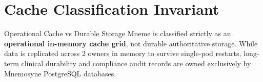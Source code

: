 \section{Cache Classification Invariant}

\begin{principlebox}{Operational Cache vs Durable Storage}
Mneme is classified strictly as an \textbf{operational in-memory cache grid}, not durable authoritative storage. While data is replicated across 2 owners in memory to survive single-pod restarts, long-term clinical durability and compliance audit records are owned exclusively by Mnemosyne PostgreSQL databases.
\end{principlebox}

\newpage
